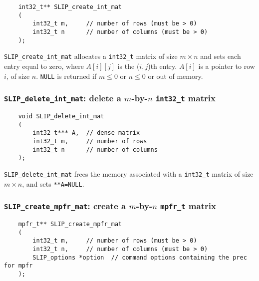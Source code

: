 \documentclass[12pt]{article}
\theoremstyle{definition}
\begin{document}
\begin{mdframed}[userdefinedwidth=6in]
{\footnotesize
\begin{verbatim}
    int32_t** SLIP_create_int_mat
    (
        int32_t m,     // number of rows (must be > 0)
        int32_t n      // number of columns (must be > 0)
    );
\end{verbatim}
} \end{mdframed}

\verb|SLIP_create_int_mat| allocates a \verb|int32_t| matrix of size $m \times
n$ and sets each entry equal to zero, where $A[i][j]$ is the ($i,j$)th entry.
$A[i]$ is a pointer to row $i$, of size $n$. \verb|NULL| is returned if
$m \le 0 $ or $n\le 0$ or out of memory.


\cprotect\subsubsection{\verb|SLIP_delete_int_mat|: delete a $m$-by-$n$ \verb|int32_t| matrix}

\begin{mdframed}[userdefinedwidth=6in]
{\footnotesize
\begin{verbatim}
    void SLIP_delete_int_mat
    (
        int32_t*** A,  // dense matrix
        int32_t m,     // number of rows
        int32_t n      // number of columns
    );
\end{verbatim}
} \end{mdframed}

\verb|SLIP_delete_int_mat| frees the memory associated with a \verb|int32_t|
matrix of size $m \times n$, and sets \verb|**A=NULL|.

\cprotect\subsubsection{\verb|SLIP_create_mpfr_mat|: create a $m$-by-$n$ \verb|mpfr_t| matrix}
\label{ss:create_mpfr_mat}

\begin{mdframed}[userdefinedwidth=6in]
{\footnotesize
\begin{verbatim}
    mpfr_t** SLIP_create_mpfr_mat
    (
        int32_t m,     // number of rows (must be > 0)
        int32_t n,     // number of columns (must be > 0)
        SLIP_options *option  // command options containing the prec for mpfr
    );
\end{verbatim}
} \end{mdframed}
\end{document}
